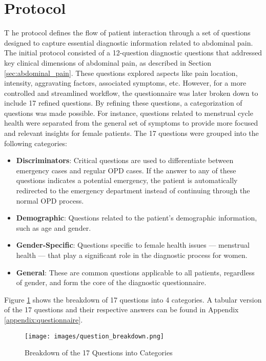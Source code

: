 \section{Protocol}
\lettrine{T}{ }he protocol defines the flow of patient interaction through a set of questions designed to capture essential diagnostic information related to abdominal pain. The initial protocol consisted of a 12-question diagnostic questions that addressed key clinical dimensions of abdominal pain, as described in Section \ref{sec:abdominal_pain}. These questions explored aspects like pain location, intensity, aggravating factors, associated symptoms, etc. However, for a more controlled and streamlined workflow, the questionnaire was later broken down to include 17 refined questions. By refining these questions, a categorization of questions was made possible. For instance, questions related to menstrual cycle health were separated from the general set of symptoms to provide more focused and relevant insights for female patients. The 17 questions were grouped into the following categories:
\begin{itemize}
    \item \textcolor{TUMRed}{\textbf{Discriminators}}: Critical questions are used to differentiate between emergency cases and regular OPD cases. If the answer to any of these questions indicates a potential emergency, the patient is automatically redirected to the emergency department instead of continuing through the normal OPD process.
    \item \textcolor{TUMRed}{\textbf{Demographic}}: Questions related to the patient's demographic information, such as age and gender.
    \item \textcolor{TUMRed}{\textbf{Gender-Specific}}: Questions specific to female health issues --- menstrual health --- that play a significant role in the diagnostic process for women.
    \item \textcolor{TUMRed}{\textbf{General}}: These are common questions applicable to all patients, regardless of gender, and form the core of the diagnostic questionnaire.
\end{itemize}
Figure \ref{fig:question_breakdown} shows the breakdown of 17 questions into 4 categories. A tabular version of the 17 questions and their respective answers can be found in Appendix \ref{appendix:questionnaire}.

\begin{figure}[H]
    \centering
    \texttt{[image: images/question\_breakdown.png]}
    \caption{Breakdown of the 17 Questions into Categories}
    \label{fig:question_breakdown}
\end{figure}

